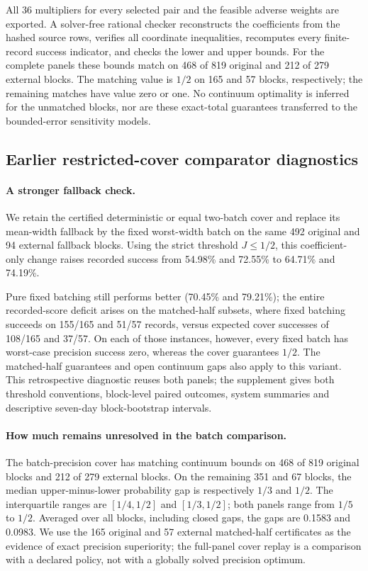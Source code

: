 All 36 multipliers for every selected pair and the feasible adverse
weights are exported.  A solver-free rational checker reconstructs the
coefficients from the hashed source rows, verifies all coordinate
inequalities, recomputes every finite-record success indicator, and checks
the lower and upper bounds.  For the complete panels these bounds match
on 468 of 819 original and 212 of 279 external blocks.  The matching value
is $1/2$ on 165 and 57 blocks, respectively; the remaining matches have
value zero or one.  No continuum optimality is inferred for the unmatched
blocks, nor are these exact-total guarantees transferred to the
bounded-error sensitivity models.
\subsection{Earlier restricted-cover comparator diagnostics}
\paragraph{A stronger fallback check.}
We retain the certified deterministic or equal two-batch cover and replace its mean-width fallback by the fixed worst-width batch on the same 492 original and 94 external fallback blocks. Using the strict threshold $J\leq1/2$, this coefficient-only change raises recorded success from 54.98\% and 72.55\% to 64.71\% and 74.19\%.

Pure fixed batching still performs better (70.45\% and 79.21\%); the entire recorded-score deficit arises on the matched-half subsets, where fixed batching succeeds on 155/165 and 51/57 records, versus expected cover successes of 108/165 and 37/57. On each of those instances, however, every fixed batch has worst-case precision success zero, whereas the cover guarantees $1/2$. The matched-half guarantees and open continuum gaps also apply to this variant. This retrospective diagnostic reuses both panels; the supplement gives both threshold conventions, block-level paired outcomes, system summaries and descriptive seven-day block-bootstrap intervals.
\paragraph{How much remains unresolved in the batch comparison.}
The batch-precision cover has matching continuum bounds on 468 of 819 original
blocks and 212 of 279 external blocks. On the remaining 351 and 67 blocks,
the median upper-minus-lower probability gap is respectively $1/3$ and $1/2$.
The interquartile ranges are $[1/4,1/2]$ and $[1/3,1/2]$; both panels range
from $1/5$ to $1/2$. Averaged over all blocks, including closed gaps, the gaps
are 0.1583 and 0.0983. We use the 165 original and 57 external matched-half certificates as the evidence
of exact precision superiority; the full-panel cover replay is a comparison
with a declared policy, not with a globally solved precision optimum.


